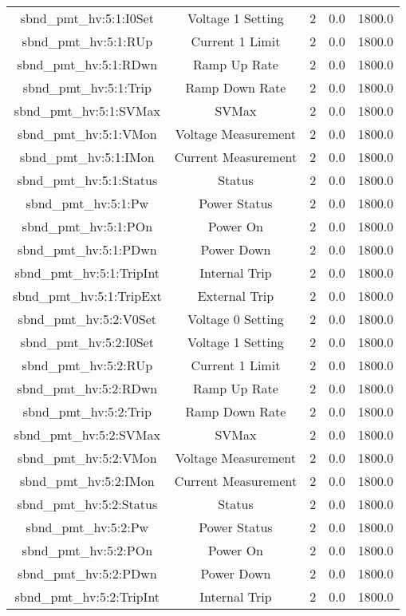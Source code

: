 \begin{center}
\begin{longtable}{c | c c c c }
sbnd\_pmt\_hv:5:1:I0Set & Voltage 1 Setting & 2 & 0.0 & 1800.0\\ 
sbnd\_pmt\_hv:5:1:RUp & Current 1 Limit & 2 & 0.0 & 1800.0\\ 
sbnd\_pmt\_hv:5:1:RDwn & Ramp Up Rate & 2 & 0.0 & 1800.0\\ 
sbnd\_pmt\_hv:5:1:Trip & Ramp Down Rate & 2 & 0.0 & 1800.0\\ 
sbnd\_pmt\_hv:5:1:SVMax & SVMax & 2 & 0.0 & 1800.0\\ 
sbnd\_pmt\_hv:5:1:VMon & Voltage Measurement & 2 & 0.0 & 1800.0\\ 
sbnd\_pmt\_hv:5:1:IMon & Current Measurement & 2 & 0.0 & 1800.0\\ 
sbnd\_pmt\_hv:5:1:Status & Status & 2 & 0.0 & 1800.0\\ 
sbnd\_pmt\_hv:5:1:Pw & Power Status & 2 & 0.0 & 1800.0\\ 
sbnd\_pmt\_hv:5:1:POn & Power On & 2 & 0.0 & 1800.0\\ 
sbnd\_pmt\_hv:5:1:PDwn & Power Down & 2 & 0.0 & 1800.0\\ 
sbnd\_pmt\_hv:5:1:TripInt & Internal Trip & 2 & 0.0 & 1800.0\\ 
sbnd\_pmt\_hv:5:1:TripExt & External Trip & 2 & 0.0 & 1800.0\\ 
sbnd\_pmt\_hv:5:2:V0Set & Voltage 0 Setting & 2 & 0.0 & 1800.0\\ 
sbnd\_pmt\_hv:5:2:I0Set & Voltage 1 Setting & 2 & 0.0 & 1800.0\\ 
sbnd\_pmt\_hv:5:2:RUp & Current 1 Limit & 2 & 0.0 & 1800.0\\ 
sbnd\_pmt\_hv:5:2:RDwn & Ramp Up Rate & 2 & 0.0 & 1800.0\\ 
sbnd\_pmt\_hv:5:2:Trip & Ramp Down Rate & 2 & 0.0 & 1800.0\\ 
sbnd\_pmt\_hv:5:2:SVMax & SVMax & 2 & 0.0 & 1800.0\\ 
sbnd\_pmt\_hv:5:2:VMon & Voltage Measurement & 2 & 0.0 & 1800.0\\ 
sbnd\_pmt\_hv:5:2:IMon & Current Measurement & 2 & 0.0 & 1800.0\\ 
sbnd\_pmt\_hv:5:2:Status & Status & 2 & 0.0 & 1800.0\\ 
sbnd\_pmt\_hv:5:2:Pw & Power Status & 2 & 0.0 & 1800.0\\ 
sbnd\_pmt\_hv:5:2:POn & Power On & 2 & 0.0 & 1800.0\\ 
sbnd\_pmt\_hv:5:2:PDwn & Power Down & 2 & 0.0 & 1800.0\\ 
sbnd\_pmt\_hv:5:2:TripInt & Internal Trip & 2 & 0.0 & 1800.0\\ 

\end{longtable}
\end{center}
